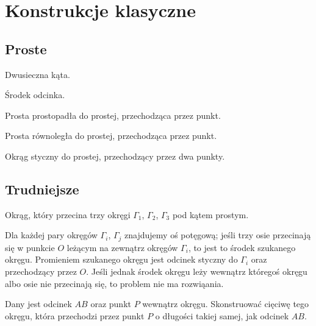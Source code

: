 %

\section{Konstrukcje klasyczne}
\subsection{Proste}
\begin{problem}
    Dwusieczna kąta.
\end{problem}

\begin{problem}
    Środek odcinka.
\end{problem}

\begin{problem}
    Prosta prostopadła do prostej, przechodząca przez punkt.
\end{problem}

\begin{problem}
    Prosta równoległa do prostej, przechodząca przez punkt.
\end{problem}

\begin{problem}
    Okrąg styczny do prostej, przechodzący przez dwa punkty.
\end{problem}



\subsection{Trudniejsze}

\begin{problem}[Monge'a?]
    Okrąg, który przecina trzy okręgi $\Gamma_1$, $\Gamma_2$, $\Gamma_3$ pod kątem prostym.
\end{problem}

Dla każdej pary okręgów $\Gamma_i$, $\Gamma_j$ znajdujemy oś potęgową; jeśli trzy osie przecinają się w punkcie $O$ leżącym na zewnątrz okręgów $\Gamma_i$, to jest to środek szukanego okręgu.
Promieniem szukanego okręgu jest odcinek styczny do $\Gamma_i$ oraz przechodzący przez $O$.
Jeśli jednak środek okręgu leży wewnątrz któregoś okręgu albo osie nie przecinają się, to problem nie ma rozwiąania.

\begin{problem}
    Dany jest odcinek $AB$ oraz punkt $P$ wewnątrz okręgu.
    Skonstruować cięciwę tego okręgu, która przechodzi przez punkt $P$ o długości takiej samej, jak odcinek $AB$.
\end{problem}

